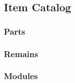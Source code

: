 \subsection{Item Catalog}

\subsubsection{Parts}

\subsubsection{Remains}

\subsubsection{Modules}




